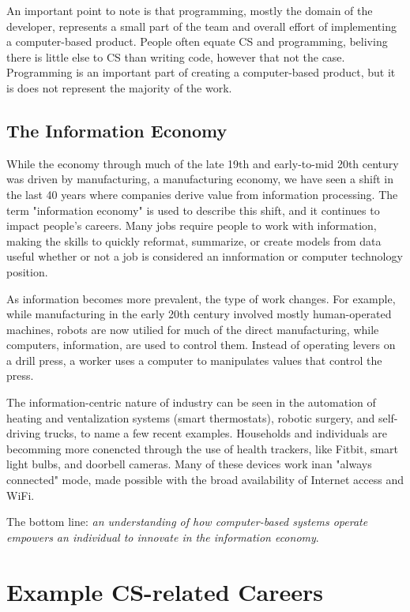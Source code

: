 An important point to note is that programming, mostly the domain of the developer, represents a small part of the team and overall effort of implementing a computer-based product. People often equate CS and programming, beliving there is little else to CS than writing code, however that not the case. Programming is an important part of creating a computer-based product, but it is does not represent the majority of the work.



\subsection{The Information Economy}


While the economy through much of the late 19th and early-to-mid 20th century was driven by manufacturing, a manufacturing economy, we have seen a shift in the last 40 years where companies derive value from information processing. The term "information economy" is used to describe this shift, and it continues to impact people's careers. Many jobs require people to work with information, making the skills to quickly reformat, summarize, or create models from data useful whether or not a job is considered an innformation or computer technology position.

As information becomes more prevalent, the type of work changes. For example, while manufacturing in the early 20th century involved mostly human-operated machines, robots are now utilied for much of the direct manufacturing, while computers, information, are used to control them. Instead of operating levers on a drill press, a worker uses a computer to manipulates values that control the press.

The information-centric nature of industry can be seen in the automation of heating and ventalization systems (smart thermostats), robotic surgery, and self-driving trucks, to name a few recent examples. Households and individuals are becomming more conencted through the use of health trackers, like Fitbit, smart light bulbs, and doorbell cameras. Many of these devices work inan "always connected" mode, made possible with the broad availability of Internet access and WiFi.

The bottom line: \emph{an understanding of how computer-based systems operate empowers an individual to innovate in the information economy}.  

	
\section{Example CS-related Careers}

